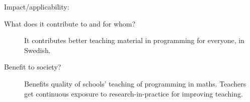 Impact/applicability:
\begin{description}
  \item[What does it contribute to and for whom?]
    It contributes better teaching material in programming for everyone, in 
    Swedish.

  \item[Benefit to society?]
    Benefits quality of schools' teaching of programming in maths.
    Teachers get continuous exposure to research-in-practice for improving 
    teaching.
\end{description}

